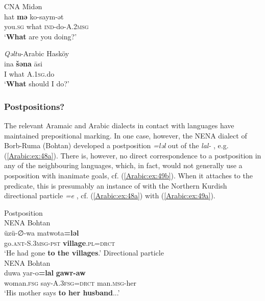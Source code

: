 \documentclass[output=paper,colorlinks,citecolor=brown,draftmode]{langscibook}
\begin{document}
\ea\label{Arabic:ex:ad3}
CNA Midən \citep[73:§273]{Ritter1967Turoyo} \\
\gll hat \textbf{mə} ko-saym-ət  \\
you\textsc{.sg} what \textsc{ind-}do\textsc{-A.2msg}\\
\glt `\textbf{What} are you doing?' 
\z

\ea\label{Arabic:ex:47}
\textit{Qəltu}-Arabic Hasköy \citep[I.2.4]{Talay2002AHaskoyT} \\
\gll ina \textbf{šəna} āsi \\
I what \textsc{A.1sg.}do \\
\glt `\textbf{What} should I do?' 
\z

\subsubsection{Postpositions?}
The relevant Aramaic and Arabic dialects in contact with  languages have maintained prepositional marking. In one case, however, the NENA dialect of Borb-Ruma (Bohtan) developed a postposition \textit{=ləl} out of the  \textit{lal-} \citep[101–102]{Fox2009NABohtan}, e.g. (\ref{Arabic:ex:48a}). There is, however, no direct correspondence to a postposition in any of the neighbouring languages, which, in fact, would not generally use a posposition with inanimate goals, cf. (\ref{Arabic:ex:49b}). When it attaches to the predicate, this is presumably an instance of  with the Northern Kurdish directional particle \textit{=e} \citep[101–102]{Fox2009NABohtan}, cf. (\ref{Arabic:ex:48a}) with (\ref{Arabic:ex:49a}).

\ea
\ea\label{Arabic:ex:48a}
Postposition \\
NENA Bohtan \citep[126:§139]{Fox2009NABohtan} \\
\gll üzü-∅-wa matwota\textbf{=lǝl} \\
go\textsc{.ant-S.3msg-pst} \textbf{village}\textsc{.pl=drct} \\
\glt `He had gone \textbf{to the villages}.'
\ex\label{Arabic:ex:48b}
Directional particle \\
NENA Bohtan \citep[118:§35]{Fox2009NABohtan} \\
\gll duwa yar-o\textbf{=lal} \textbf{gawr-aw} \\
woman\textsc{.fsg} say\textsc{-A.3fsg=drct} man\textsc{.msg-}her \\
\glt `His mother says \textbf{to her husband}...' 
\z
\z
\end{document}
